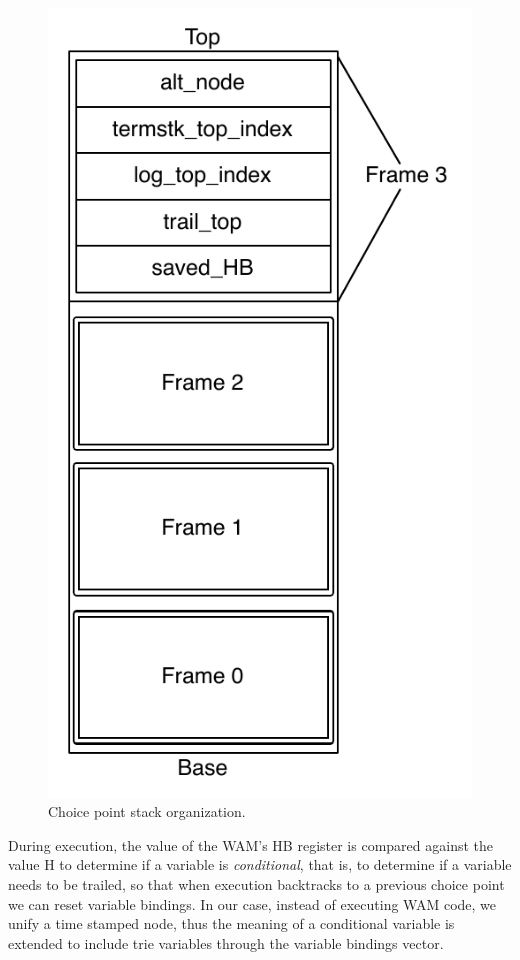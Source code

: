 \begin{figure}[H]
  \centering
    \includegraphics[scale=0.45]{choice_point_stack.pdf}
  \caption{Choice point stack organization.}
  \label{fig:choice_point_stack}
\end{figure}

During execution, the value of the WAM's HB register is compared against the value H to determine if a variable is \textit{conditional}, that is, to determine if a variable needs to be trailed, so that when execution backtracks to a previous choice point we can reset variable bindings. In our case, instead of executing WAM code, we unify a time stamped node, thus the meaning of a conditional variable is extended to include trie variables through the variable bindings vector.

